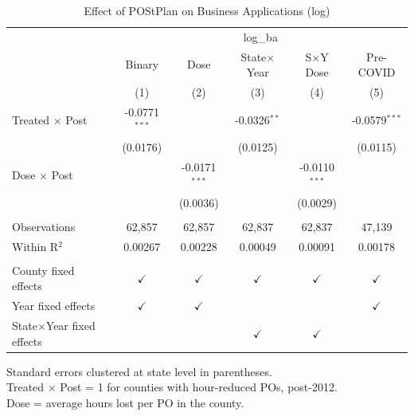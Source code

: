 
\begin{table}[htbp]
   \caption{\label{tab:main} Effect of POStPlan on Business Applications (log)}
   \bigskip
   \centering
   \begin{tabular}{lccccc}
      \toprule
       & \multicolumn{5}{c}{log\_ba}\\
                                       & Binary          & Dose            & State$\times$Year  & S$\times$Y Dose  & Pre-COVID \\   
                                       & (1)             & (2)             & (3)                & (4)              & (5)\\  
      \midrule 
      Treated $\times$ Post            & -0.0771$^{***}$ &                 & -0.0326$^{**}$     &                  & -0.0579$^{***}$\\   
                                       & (0.0176)        &                 & (0.0125)           &                  & (0.0115)\\   
      Dose $\times$ Post               &                 & -0.0171$^{***}$ &                    & -0.0110$^{***}$  &   \\   
                                       &                 & (0.0036)        &                    & (0.0029)         &   \\   
       \\
      Observations                     & 62,857          & 62,857          & 62,837             & 62,837           & 47,139\\  
      Within R$^2$                     & 0.00267         & 0.00228         & 0.00049            & 0.00091          & 0.00178\\  
       \\
      County fixed effects             & $\checkmark$    & $\checkmark$    & $\checkmark$       & $\checkmark$     & $\checkmark$\\   
      Year fixed effects               & $\checkmark$    & $\checkmark$    &                    &                  & $\checkmark$\\   
      State$\times$Year fixed effects  &                 &                 & $\checkmark$       & $\checkmark$     & \\  
      \bottomrule
   \end{tabular}
   
   \par \raggedright 
   Standard errors clustered at state level in parentheses.\\
   Treated $\times$ Post = 1 for counties with hour-reduced POs, post-2012.\\
   Dose = average hours lost per PO in the county.
\end{table}


